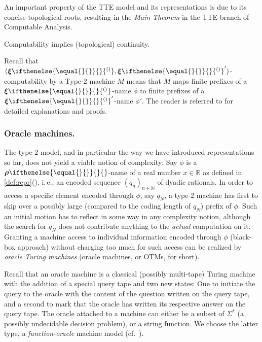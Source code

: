 \documentclass{CSML}
\newcommand{\representation}[2]{ #1\ifnotempty{#2}{^{(#2)}} }
\newcommand{\IN}{\mathbb{N}}
\newcommand{\IR}{\mathbb{R}}
\newcommand{\Sast}{\Sigma^\ast}
\newcommand{\realrep}[1][\empty]{ \bm{\rho}\ifnotempty{#1}{^{#1}} }
\newcommand{\reptpl}[1][\empty]{ \representation{\bm{\xi}}{#1} }
\newcommand{\ifnotempty}[2]{ \ifthenelse{ \equal{#1}{\empty} }{}{#2} }
\newcommand{\ie}{\mbox{i.\,e.}\xspace}
\begin{document}
An important property of the TTE model and its
representations is due to its concise topological roots, resulting in the
\emph{Main Theorem} in the TTE-branch of Computable Analysis.

\begin{fact} \label{s:tte-cont}
	Computability implies (topological) continuity.
\end{fact}

Recall that $(\reptpl,\reptpl')$-computability by a Type-2 machine $M$ means
that $M$ maps finite prefixes of a $\reptpl$-name $\phi$ to finite prefixes of
a $\reptpl'$-name $\phi'$.
%
The reader is referred to \cite[Thm.~2.2.3+3.2.11]{Weih00} for detailed
explanations and proofs.


\subsubsection{Oracle machines.}


The type-2 model, and in particular the way we have introduced representations
so far, does not yield a viable notion of complexity:
Say $\phi$ is a $\realrep$-name of a real number $x \in \IR$ as
defined in \cref{def:repr}(), \ie, an encoded sequence
$(q_n)_{n \in \IN}$ of dyadic rationals.
In order to access a specific element encoded through $\phi$,
say $q_N$, a type-2 machine has first to skip over a possibly large (compared
to the coding length of $q_N$) prefix of $\phi$. Such an initial motion has to
reflect in some way in any complexity notion, although the search for $q_N$
does not contribute anything to the \emph{actual} computation on it.
Granting a machine access to individual information encoded through $\phi$
(black-box approach) without charging too much for such access can be realized
by \emph{oracle Turing machines} (oracle machines, or OTMs, for short).

Recall that an oracle machine is a classical (possibly multi-tape) Turing
machine with the addition of a special query tape and two new states: One to
initiate the query to the oracle with the content of the question written on
the query tape,
and a second to mark that the oracle has written its respective answer on
the query tape. The oracle attached to a machine can either be a subset of
$\Sast$ (a possibly undecidable decision problem), or a string function.
We choose the latter type, a \emph{function-oracle} machine model
(cf.~\cite[Def.~2.11]{Ko91}).
\end{document}
